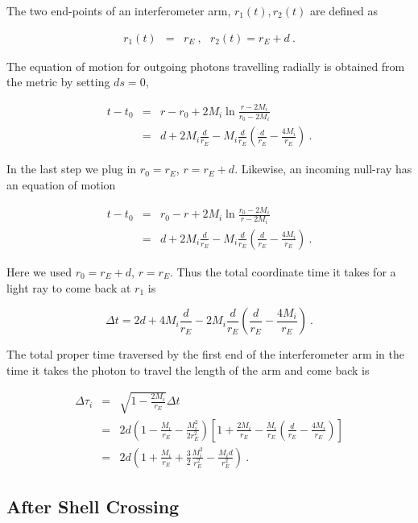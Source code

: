 \documentclass[aps,showpacs,twocolumn,floats,prd,superscriptaddress,nofootinbib]{revtex4-1}
\begin{document}
The two end-points of an interferometer arm, $r_1(t), r_2(t)$ are defined as

\begin{eqnarray}
r_1(t) &=& r_{E}~, \ \ \ r_2(t) = r_{E}+d~.
\end{eqnarray}

The equation of motion for outgoing photons travelling radially is obtained from the metric by setting $ds=0$,

\begin{eqnarray}
t-t_0 &=& r-r_0 + 2M_i\ln\frac{r-2M_i}{r_0-2M_i} \\ \nonumber
&=& d + 2M_i\frac{d}{r_E} -M_i\frac{d}{r_E}
\left( \frac{d}{r_E}-\frac{4M_i}{r_E} \right)~.
\label{eq-dt1}
\end{eqnarray}

In the last step we plug in $r_0=r_E$, $r = r_E+d$. Likewise, an incoming null-ray has an equation of motion

\begin{eqnarray}
t-t_0 &=& r_0-r + 2M_i\ln\frac{r_0-2M_i}{r-2M_i} \\ \nonumber
&=& d + 2M_i\frac{d}{r_E} - M_i\frac{d}{r_E}
\left( \frac{d}{r_E}-\frac{4M_i}{r_E} \right) ~.
\end{eqnarray}

Here we used $r_0 = r_E+d$, $r = r_E$. Thus the total coordinate time it takes for a light ray to come back at $r_1$ is

\begin{equation}
\Delta t = 2d + 4M_i\frac{d}{r_E} - 2M_i\frac{d}{r_E}
\left( \frac{d}{r_E}-\frac{4M_i}{r_E} \right)~.
\end{equation}

The total proper time traversed by the first end of the interferometer arm in the time it takes the photon to travel the length of the arm and come back is 

\begin{eqnarray}
\Delta \tau_i &=& \sqrt{1-\frac{2M_i}{r_E}}\Delta t  \\ \nonumber
&=& 2d \left(1-\frac{M_i}{r_E} - \frac{M_i^2}{2r_E^2}\right) 
\left[ 1+\frac{2M_i}{r_E} - \frac{M_i}{r_E}\left( \frac{d}{r_E} - \frac{4M_i}{r_E} \right) \right] \\ \nonumber
&=& 2d
\left(1 + \frac{M_i}{r_E} + \frac{3}{2}\frac{M_i^2}{r_E^2} - \frac{M_id}{r_E^2}\right)~.
\end{eqnarray}

\subsection{After Shell Crossing}
\end{document}
